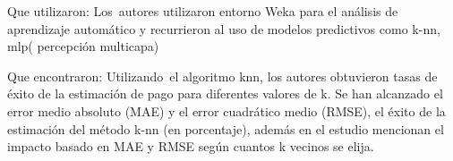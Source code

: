 \documentclass[12pt]{report}
\renewcommand{\_}{\kern-1.5pt\textunderscore\kern-1.5pt}
\begin{document}
\vspace{\baselineskip}
Que utilizaron:
Los\ autores utilizaron entorno Weka  para el análisis de aprendizaje automático y recurrieron al uso de modelos predictivos como {\fontsize{11pt}{13.2pt}\selectfont k-nn, mlp( percepción multicapa)}

\vspace{\baselineskip}
Que encontraron:
Utilizando\ el algoritmo knn, los autores obtuvieron  tasas de éxito de la estimación de pago para diferentes valores de k. Se han alcanzado el error medio absoluto (MAE) y el error cuadrático medio (RMSE), el éxito de la estimación del método k-nn (en porcentaje), además en el estudio mencionan el impacto basado en MAE y RMSE según cuantos k vecinos se elija.

\vspace{\baselineskip}

\vspace{\baselineskip}

\vspace{\baselineskip}

\vspace{\baselineskip}

\vspace{\baselineskip}

\vspace{\baselineskip}

\vspace{\baselineskip}

\vspace{\baselineskip}

\vspace{\baselineskip}

\vspace{\baselineskip}

\vspace{\baselineskip}

\vspace{\baselineskip}

\vspace{\baselineskip}

\vspace{\baselineskip}

\vspace{\baselineskip}

\vspace{\baselineskip}

\vspace{\baselineskip}

\vspace{\baselineskip}
\end{document}
